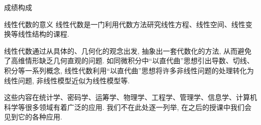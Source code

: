 \begin{frame}{成绩构成}
\begin{center}
\end{center}
\end{frame}


\begin{frame}{线性代数的意义}
	\onslide<+->
	线性代数是一门利用\alert{代数方法}研究\alert{线性方程、线性空间、线性变换}等线性结构的课程.

	\onslide<+->
	线性代数通过从具体的、几何化的观念出发, 抽象出一套代数化的方法, 从而避免了高维情形缺乏几何直观的问题. 
	\onslide<+->
	如同微积分中“以直代曲”思想引出导数、切线、积分等一系列概念, 线性代数利用“以直代曲”思想将许多非线性问题的处理转化为线性问题, 非线性模型近似为线性模型等.
	
	\onslide<+->
	这些内容在统计学、密码学、运筹学、物理学、工程学、管理学、信息学、计算机科学等很多领域有着广泛的应用.
	\onslide<+->
	我们不在此处逐一列举, 在之后的授课中我们会见到它的各种应用.
\end{frame}


